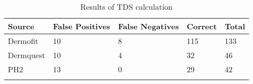 \begin{longtable}{ | l | l | l | l | l |}
\hline
Source & False Positives & False Negatives & Correct & Total \\ \hline
Dermofit & 10 & 8 & 115 & 133 \\
Dermquest & 10 & 4 & 32 & 46 \\
PH2 & 13 & 0 & 29 & 42 \\
\hline
\caption{Results of TDS calculation}
\label{fig:tda_overview}
\end{longtable}